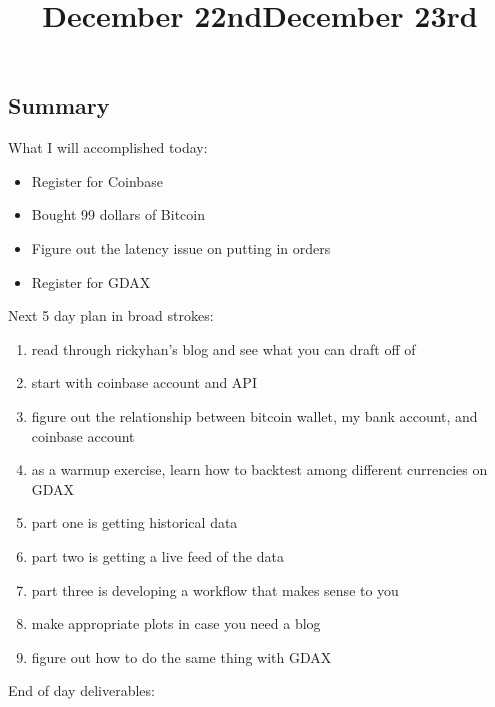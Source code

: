 \title{December 22nd}

\subsection{Summary}

What I will accomplished today:

\begin{itemize}
	\item Register for Coinbase
	\item Bought 99 dollars of Bitcoin
	\item Figure out the latency issue on putting in orders
	\item Register for GDAX
\end{itemize}


\title{December 23rd}

Next 5 day plan in broad strokes:

\begin{enumerate}
	\item read through rickyhan's blog and see what you can draft off of
	\item start with coinbase account and API
	\item figure out the relationship between bitcoin wallet, my bank account, and coinbase account
	\item as a warmup exercise, learn how to backtest among different currencies on GDAX
	\item part one is getting historical data
	\item part two is getting a live feed of the data
	\item part three is developing a workflow that makes sense to you
	\item make appropriate plots in case you need a blog
	\item figure out how to do the same thing with GDAX
\end{enumerate}


End of day deliverables: 

